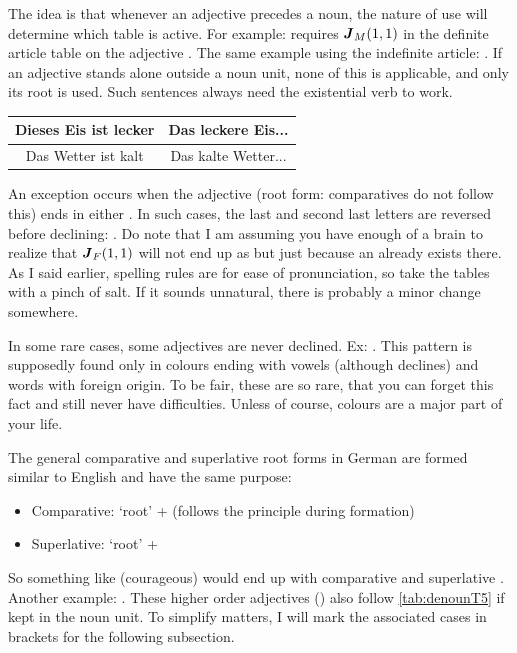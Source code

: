 The idea is that whenever an adjective precedes a noun, the nature of use will determine which table is active. For example:  requires $\boldsymbol{J}_{M}(1,1)$ in the definite article table on the adjective . The same example using the indefinite article: . If an adjective stands alone outside a noun unit, none of this is applicable, and only its root  is used. Such sentences always need the existential verb  to work.
\begin{example}
    \begin{tabular}{c|c}
        Dieses Eis ist lecker & Das leckere Eis...\\\hline
        Das Wetter ist kalt & Das kalte Wetter...
    \end{tabular}
\end{example}
An exception occurs when the adjective (root form: comparatives do not follow this) ends in either . In such cases, the last and second last letters are reversed before declining: . Do note that I am assuming you have enough of a brain to realize that $\boldsymbol{J}_{F}(1,1)$  will not end up as  but just  because an  already exists there. As I said earlier, spelling rules are  for ease of pronunciation, so take the tables with a pinch of salt. If it sounds unnatural, there is probably a minor change somewhere.

In some rare cases, some adjectives are  never declined. Ex: . This pattern is supposedly found only in colours ending with vowels (although  declines) and words with foreign origin. To be fair, these are so rare, that you can forget this fact and still never have difficulties. Unless of course, colours are a major part of your life.

The general  comparative and superlative root forms in German are formed similar to English and have the same purpose:
\begin{itemize}[leftmargin=25pt]
    \item Comparative: `root' +  (follows the  principle during formation)
    \item Superlative:  `root' + 
\end{itemize}
So something like  (courageous) would end up with comparative  and superlative . Another example: . These higher order adjectives () also follow \autoref{tab:denounT5} if kept in the noun unit. To simplify matters, I will mark the associated cases in brackets for the following subsection.

